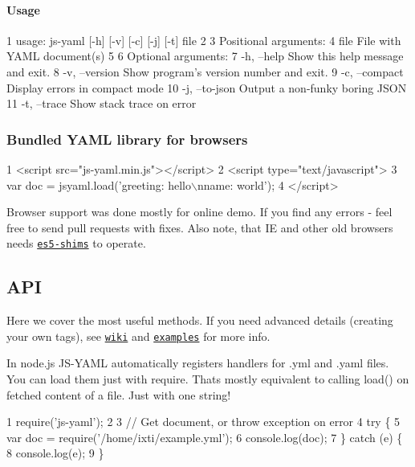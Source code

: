 \paragraph*{Usage}


\begin{DoxyCode}
1 usage: js-yaml [-h] [-v] [-c] [-j] [-t] file
2 
3 Positional arguments:
4   file           File with YAML document(s)
5 
6 Optional arguments:
7   -h, --help     Show this help message and exit.
8   -v, --version  Show program's version number and exit.
9   -c, --compact  Display errors in compact mode
10   -j, --to-json  Output a non-funky boring JSON
11   -t, --trace    Show stack trace on error
\end{DoxyCode}


\subsubsection*{Bundled Y\+A\+M\+L library for browsers}


\begin{DoxyCode}
1 <script src="js-yaml.min.js"></script>
2 <script type="text/javascript">
3 var doc = jsyaml.load('greeting: hello\(\backslash\)nname: world');
4 </script>
\end{DoxyCode}


Browser support was done mostly for online demo. If you find any errors -\/ feel free to send pull requests with fixes. Also note, that I\+E and other old browsers needs \href{https://github.com/kriskowal/es5-shim}{\tt es5-\/shims} to operate.

\subsection*{A\+P\+I }

Here we cover the most \textquotesingle{}useful\textquotesingle{} methods. If you need advanced details (creating your own tags), see \href{https://github.com/nodeca/js-yaml/wiki}{\tt wiki} and \href{https://github.com/nodeca/js-yaml/tree/master/examples}{\tt examples} for more info.

In node.\+js J\+S-\/\+Y\+A\+M\+L automatically registers handlers for {\ttfamily .yml} and {\ttfamily .yaml} files. You can load them just with {\ttfamily require}. That\textquotesingle{}s mostly equivalent to calling {\ttfamily load()} on fetched content of a file. Just with one string!


\begin{DoxyCode}
1 require('js-yaml');
2 
3 // Get document, or throw exception on error
4 try \{
5   var doc = require('/home/ixti/example.yml');
6   console.log(doc);
7 \} catch (e) \{
8   console.log(e);
9 \}
\end{DoxyCode}


